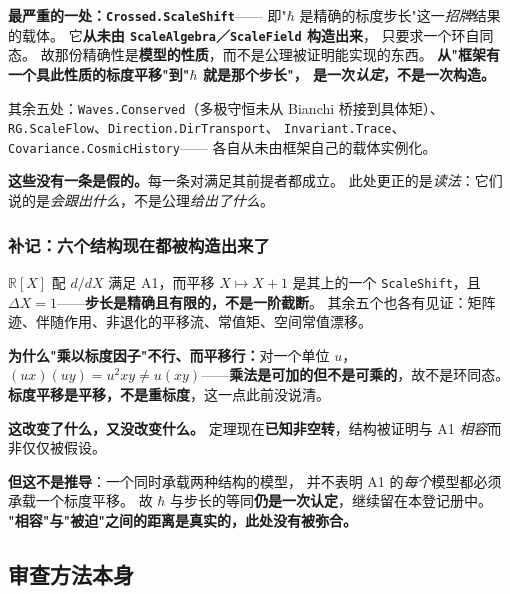 \documentclass[11pt,a4paper]{article}
\theoremstyle{sudef}
\begin{document}
\begin{mdframed}[linecolor=red!60!black,linewidth=1.2pt,backgroundcolor=red!4]
\textbf{最严重的一处：\texttt{Crossed.ScaleShift}}——
即"$\hbar$ 是精确的标度步长"这一\emph{招牌}结果的载体。
它\textbf{从未由 \texttt{ScaleAlgebra}／\texttt{ScaleField} 构造出来}，
只要求一个环自同态。
故那份精确性是\textbf{模型的性质}，而不是公理被证明能实现的东西。
\textbf{从"框架有一个具此性质的标度平移"到"$\hbar$ 就是那个步长"，
是一次\emph{认定}，不是一次构造。}

其余五处：\texttt{Waves.Conserved}（多极守恒未从 Bianchi 桥接到具体矩）、
\texttt{RG.ScaleFlow}、\texttt{Direction.DirTransport}、
\texttt{Invariant.Trace}、\texttt{Covariance.CosmicHistory}——
各自从未由框架自己的载体实例化。

\textbf{这些没有一条是假的。}每一条对满足其前提者都成立。
此处更正的是\emph{读法}：它们说的是\emph{会跟出什么}，不是公理\emph{给出了什么}。
\end{mdframed}

\subsubsection*{补记：六个结构现在都被构造出来了}

$\mathbb R[X]$ 配 $d/dX$ 满足 A1，而平移 $X\mapsto X+1$ 是其上的一个
\texttt{ScaleShift}，且 $\Delta X = 1$——\textbf{步长是精确且有限的，不是一阶截断}。
其余五个也各有见证：矩阵迹、伴随作用、非退化的平移流、常值矩、空间常值漂移。

\textbf{为什么"乘以标度因子"不行、而平移行：}对一个单位 $u$，
$(ux)(uy)=u^2xy\neq u(xy)$——\textbf{乘法是可加的但不是可乘的}，故不是环同态。
\textbf{标度平移是平移，不是重标度}，这一点此前没说清。

\begin{mdframed}[linecolor=red!60!black,linewidth=1.2pt,backgroundcolor=red!4]
\textbf{这改变了什么，又没改变什么。}
定理现在\textbf{已知非空转}，结构被证明与 A1 \emph{相容}而非仅仅被假设。

\textbf{但这不是推导}：一个同时承载两种结构的模型，
并不表明 A1 的\emph{每个}模型都必须承载一个标度平移。
故 $\hbar$ 与步长的等同\textbf{仍是一次认定}，继续留在本登记册中。
\textbf{"相容"与"被迫"之间的距离是真实的，此处没有被弥合。}
\end{mdframed}

\subsection{审查方法本身}
\end{document}
